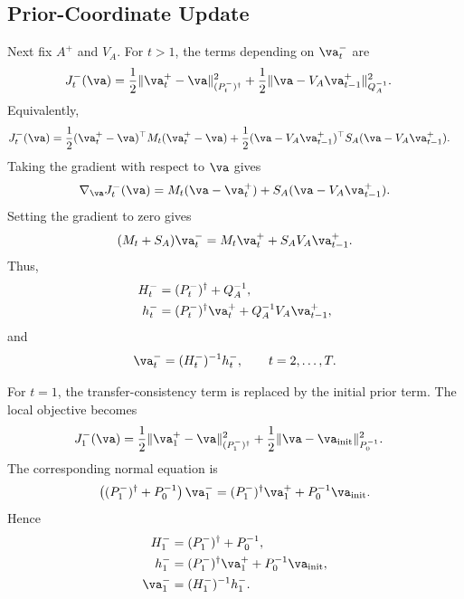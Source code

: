 \documentclass[twoside,11pt]{article}
\begin{document}
\subsection{Prior-Coordinate Update}

Next fix $A^+$ and $V_A$. For $t>1$, the terms depending on
$\va_t^-$ are
\begin{align}
J_t^-(\va)
&=
\frac12
\|\va_t^+ - \va\|_{(P_t^-)^\dagger}^2
+
\frac12
\|\va - V_A\va_{t-1}^+\|_{Q_A^{-1}}^2 .
\label{eq:app_Aminus_local_objective}
\end{align}
Equivalently,
\begin{align}
J_t^-(\va)
&=
\frac12
(\va_t^+ - \va)^\top
M_t
(\va_t^+ - \va)
+
\frac12
(\va - V_A\va_{t-1}^+)^\top
S_A
(\va - V_A\va_{t-1}^+).
\label{eq:app_Aminus_local_objective_expanded}
\end{align}
Taking the gradient with respect to $\va$ gives
\begin{align}
\nabla_\va J_t^-(\va)
=
M_t(\va-\va_t^+)
+
S_A(\va - V_A\va_{t-1}^+).
\label{eq:app_Aminus_gradient}
\end{align}
Setting the gradient to zero gives
\begin{align}
(M_t+S_A)\va_t^-
=
M_t\va_t^+
+
S_A V_A\va_{t-1}^+.
\label{eq:app_Aminus_normal_equation_short}
\end{align}
Thus,
\begin{align}
H_t^-
&=
(P_t^-)^\dagger
+
Q_A^{-1},
\label{eq:app_Aminus_H}
\\
h_t^-
&=
(P_t^-)^\dagger\va_t^+
+
Q_A^{-1}V_A\va_{t-1}^+,
\label{eq:app_Aminus_h}
\end{align}
and
\begin{align}
\va_t^-
=
(H_t^-)^{-1}h_t^-,
\qquad
t=2,\dots,T.
\label{eq:app_Aminus_solution}
\end{align}

For $t=1$, the transfer-consistency term is replaced by the initial
prior term. The local objective becomes
\begin{align}
J_1^-(\va)
&=
\frac12
\|\va_1^+ - \va\|_{(P_1^-)^\dagger}^2
+
\frac12
\|\va - \va_{\mathrm{init}}\|_{P_0^{-1}}^2.
\label{eq:app_Aminus_initial_objective}
\end{align}
The corresponding normal equation is
\begin{align}
\left(
(P_1^-)^\dagger + P_0^{-1}
\right)\va_1^-
=
(P_1^-)^\dagger\va_1^+
+
P_0^{-1}\va_{\mathrm{init}}.
\label{eq:app_Aminus_initial_normal}
\end{align}
Hence
\begin{align}
H_1^-
&=
(P_1^-)^\dagger+P_0^{-1},
\label{eq:app_Aminus_initial_H}
\\
h_1^-
&=
(P_1^-)^\dagger\va_1^+
+
P_0^{-1}\va_{\mathrm{init}},
\label{eq:app_Aminus_initial_h}
\\
\va_1^-
&=
(H_1^-)^{-1}h_1^-.
\label{eq:app_Aminus_initial_solution}
\end{align}
\end{document}
